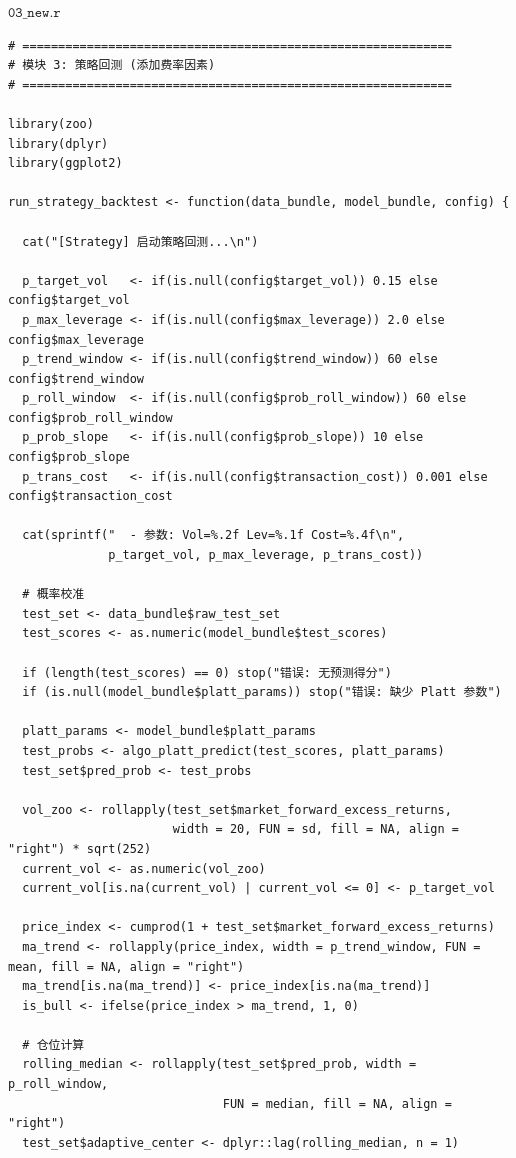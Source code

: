 \documentclass[11pt, a4paper]{article}
\begin{document}
$\texttt{03\_new.r}$
\begin{verbatim}
# ============================================================
# 模块 3: 策略回测 (添加费率因素)
# ============================================================

library(zoo)
library(dplyr)
library(ggplot2)

run_strategy_backtest <- function(data_bundle, model_bundle, config) {
  
  cat("[Strategy] 启动策略回测...\n")
  
  p_target_vol   <- if(is.null(config$target_vol)) 0.15 else config$target_vol
  p_max_leverage <- if(is.null(config$max_leverage)) 2.0 else config$max_leverage
  p_trend_window <- if(is.null(config$trend_window)) 60 else config$trend_window
  p_roll_window  <- if(is.null(config$prob_roll_window)) 60 else config$prob_roll_window
  p_prob_slope   <- if(is.null(config$prob_slope)) 10 else config$prob_slope
  p_trans_cost   <- if(is.null(config$transaction_cost)) 0.001 else config$transaction_cost 
  
  cat(sprintf("  - 参数: Vol=%.2f Lev=%.1f Cost=%.4f\n", 
              p_target_vol, p_max_leverage, p_trans_cost))
  
  # 概率校准
  test_set <- data_bundle$raw_test_set
  test_scores <- as.numeric(model_bundle$test_scores)
  
  if (length(test_scores) == 0) stop("错误: 无预测得分")
  if (is.null(model_bundle$platt_params)) stop("错误: 缺少 Platt 参数")
  
  platt_params <- model_bundle$platt_params
  test_probs <- algo_platt_predict(test_scores, platt_params)
  test_set$pred_prob <- test_probs
  
  vol_zoo <- rollapply(test_set$market_forward_excess_returns, 
                       width = 20, FUN = sd, fill = NA, align = "right") * sqrt(252)
  current_vol <- as.numeric(vol_zoo)
  current_vol[is.na(current_vol) | current_vol <= 0] <- p_target_vol 
  
  price_index <- cumprod(1 + test_set$market_forward_excess_returns)
  ma_trend <- rollapply(price_index, width = p_trend_window, FUN = mean, fill = NA, align = "right")
  ma_trend[is.na(ma_trend)] <- price_index[is.na(ma_trend)]
  is_bull <- ifelse(price_index > ma_trend, 1, 0)
  
  # 仓位计算
  rolling_median <- rollapply(test_set$pred_prob, width = p_roll_window, 
                              FUN = median, fill = NA, align = "right")
  test_set$adaptive_center <- dplyr::lag(rolling_median, n = 1)
  

\end{verbatim}
\end{document}
